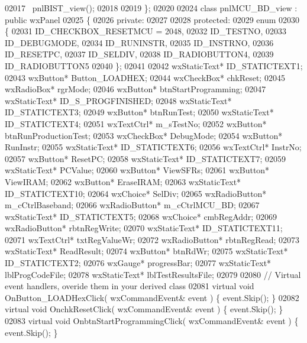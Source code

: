 \begin{DoxyCode}
02017         ~pnlBIST_view();
02018     
02019 \};
02020 
02024 \textcolor{keyword}{class }pnlMCU_BD_view : \textcolor{keyword}{public} wxPanel 
02025 \{
02026     \textcolor{keyword}{private}:
02027     
02028     \textcolor{keyword}{protected}:
02029         \textcolor{keyword}{enum}
02030         \{
02031             ID\_CHECKBOX\_RESETMCU = 2048,
02032             ID_TESTNO,
02033             ID_DEBUGMODE,
02034             ID_RUNINSTR,
02035             ID_INSTRNO,
02036             ID_RESETPC,
02037             ID_SELDIV,
02038             ID_RADIOBUTTON4,
02039             ID\_RADIOBUTTON5
02040         \};
02041         
02042         wxStaticText* ID_STATICTEXT1;
02043         wxButton* Button_LOADHEX;
02044         wxCheckBox* chkReset;
02045         wxRadioBox* rgrMode;
02046         wxButton* btnStartProgramming;
02047         wxStaticText* ID_S_PROGFINISHED;
02048         wxStaticText* ID_STATICTEXT3;
02049         wxButton* btnRunTest;
02050         wxStaticText* ID_STATICTEXT4;
02051         wxTextCtrl* m_sTestNo;
02052         wxButton* btnRunProductionTest;
02053         wxCheckBox* DebugMode;
02054         wxButton* RunInstr;
02055         wxStaticText* ID_STATICTEXT6;
02056         wxTextCtrl* InstrNo;
02057         wxButton* ResetPC;
02058         wxStaticText* ID_STATICTEXT7;
02059         wxStaticText* PCValue;
02060         wxButton* ViewSFRs;
02061         wxButton* ViewIRAM;
02062         wxButton* EraseIRAM;
02063         wxStaticText* ID_STATICTEXT10;
02064         wxChoice* SelDiv;
02065         wxRadioButton* m_cCtrlBaseband;
02066         wxRadioButton* m_cCtrlMCU_BD;
02067         wxStaticText* ID_STATICTEXT5;
02068         wxChoice* cmbRegAddr;
02069         wxRadioButton* rbtnRegWrite;
02070         wxStaticText* ID_STATICTEXT11;
02071         wxTextCtrl* txtRegValueWr;
02072         wxRadioButton* rbtnRegRead;
02073         wxStaticText* ReadResult;
02074         wxButton* btnRdWr;
02075         wxStaticText* ID_STATICTEXT2;
02076         wxGauge* progressBar;
02077         wxStaticText* lblProgCodeFile;
02078         wxStaticText* lblTestResultsFile;
02079         
02080         \textcolor{comment}{// Virtual event handlers, overide them in your derived class}
02081         \textcolor{keyword}{virtual} \textcolor{keywordtype}{void} OnButton_LOADHexClick( wxCommandEvent& event ) \{ \textcolor{keyword}{event}.Skip(); \}
02082         \textcolor{keyword}{virtual} \textcolor{keywordtype}{void} OnchkResetClick( wxCommandEvent& event ) \{ \textcolor{keyword}{event}.Skip(); \}
02083         \textcolor{keyword}{virtual} \textcolor{keywordtype}{void} OnbtnStartProgrammingClick( wxCommandEvent& event ) \{ \textcolor{keyword}{event}.Skip(); \}

\end{DoxyCode}

